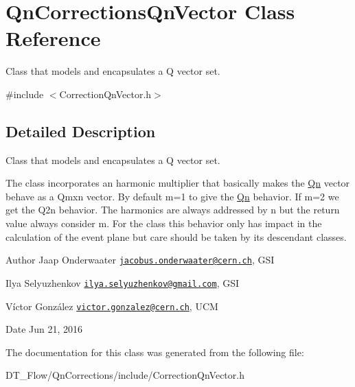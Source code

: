 \hypertarget{classQnCorrectionsQnVector}{}\section{Qn\+Corrections\+Qn\+Vector Class Reference}
\label{classQnCorrectionsQnVector}


Class that models and encapsulates a Q vector set.  




{\ttfamily \#include $<$Correction\+Qn\+Vector.\+h$>$}



\subsection{Detailed Description}
Class that models and encapsulates a Q vector set. 

The class incorporates an harmonic multiplier that basically makes the \mbox{\hyperlink{namespaceQn}{Qn}} vector behave as a Qmxn vector. By default m=1 to give the \mbox{\hyperlink{namespaceQn}{Qn}} behavior. If m=2 we get the Q2n behavior. The harmonics are always addressed by n but the return value always consider m. For the class this behavior only has impact in the calculation of the event plane but care should be taken by its descendant classes. \begin{DoxyAuthor}{Author}
Jaap Onderwaater \href{mailto:jacobus.onderwaater@cern.ch}{\tt jacobus.\+onderwaater@cern.\+ch}, G\+SI 

Ilya Selyuzhenkov \href{mailto:ilya.selyuzhenkov@gmail.com}{\tt ilya.\+selyuzhenkov@gmail.\+com}, G\+SI 

Víctor González \href{mailto:victor.gonzalez@cern.ch}{\tt victor.\+gonzalez@cern.\+ch}, U\+CM 
\end{DoxyAuthor}
\begin{DoxyDate}{Date}
Jun 21, 2016 
\end{DoxyDate}


The documentation for this class was generated from the following file\+:\begin{DoxyCompactItemize}
\item 
D\+T\+\_\+\+Flow/\+Qn\+Corrections/include/Correction\+Qn\+Vector.\+h\end{DoxyCompactItemize}
